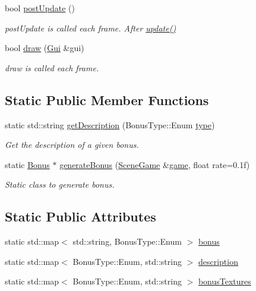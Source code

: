 \begin{DoxyCompactItemize}
bool \hyperlink{class_bonus_a6524cf732f98dfc3baa7f41bbdf13b11}{post\+Update} ()
\begin{DoxyCompactList}\small\item\em post\+Update is called each frame. After \hyperlink{class_bonus_a0dd8aa4474c3d1ef494ed8a916cc16cd}{update()} \end{DoxyCompactList}\item 
bool \hyperlink{class_bonus_acdb40deca7be37984084fb3d4fef85ed}{draw} (\hyperlink{class_gui}{Gui} \&gui)
\begin{DoxyCompactList}\small\item\em draw is called each frame. \end{DoxyCompactList}\end{DoxyCompactItemize}
\subsection*{Static Public Member Functions}
\begin{DoxyCompactItemize}
\item 
static std\+::string \hyperlink{class_bonus_a1d044965859366e57fbe7fcb1eb8a458}{get\+Description} (Bonus\+Type\+::\+Enum \hyperlink{class_a_entity_a4cddb4c9fbae86691e73940edc3731c3}{type})
\begin{DoxyCompactList}\small\item\em Get the description of a given bonus. \end{DoxyCompactList}\item 
static \hyperlink{class_bonus}{Bonus} $\ast$ \hyperlink{class_bonus_a69c5cd0fdef8eef925b5d295696b19a9}{generate\+Bonus} (\hyperlink{class_scene_game}{Scene\+Game} \&\hyperlink{class_a_entity_aa2c05db944a8b7487eb8470dd20211ab}{game}, float rate=0.\+1f)
\begin{DoxyCompactList}\small\item\em Static class to generate bonus. \end{DoxyCompactList}\end{DoxyCompactItemize}
\subsection*{Static Public Attributes}
\begin{DoxyCompactItemize}
\item 
static std\+::map$<$ std\+::string, Bonus\+Type\+::\+Enum $>$ \hyperlink{class_bonus_a44ca4e53cfd07e7a1c3cfac191fdf624}{bonus}
\item 
static std\+::map$<$ Bonus\+Type\+::\+Enum, std\+::string $>$ \hyperlink{class_bonus_a4d328bd69b4cbae25312758d68991e26}{description}
\item 
static std\+::map$<$ Bonus\+Type\+::\+Enum, std\+::string $>$ \hyperlink{class_bonus_ad5d507d977155bd7d9a027e77b51b29c}{bonus\+Textures}
\end{DoxyCompactItemize}
